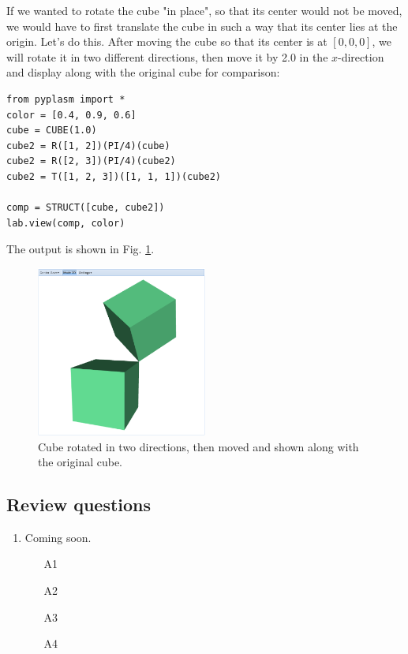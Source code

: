 \documentclass{article}
\begin{document}
If we wanted to 
rotate the cube "in place", so that its center would not be moved,
we would have to first translate the cube in such a way that its center
lies at the origin. Let's do this. After moving the cube so that 
its center is at $[0, 0, 0]$, we will rotate it in two different directions,
then move it by 2.0 in the $x$-direction and display along with 
the original cube for comparison:

\begin{verbatim}
from pyplasm import *
color = [0.4, 0.9, 0.6]
cube = CUBE(1.0)
cube2 = R([1, 2])(PI/4)(cube)
cube2 = R([2, 3])(PI/4)(cube2)
cube2 = T([1, 2, 3])([1, 1, 1])(cube2)

comp = STRUCT([cube, cube2])
lab.view(comp, color)
\end{verbatim}
The output is shown in Fig. \ref{fig:rot-2}.
\newpage

\begin{figure}[!ht]
\begin{center}
\includegraphics[width=0.5\textwidth]{img/rot-2.png}
\end{center}
\vspace{-2mm}
\caption{Cube rotated in two directions, then moved and shown along with the original cube.}
\label{fig:rot-2}
\end{figure}

\subsection{Review questions}

\begin{enumerate}
\item Coming soon.
\begin{itemize}
\item[A1]
\item[A2]
\item[A3]
\item[A4]
\end{itemize}
\end{enumerate}
\end{document}
